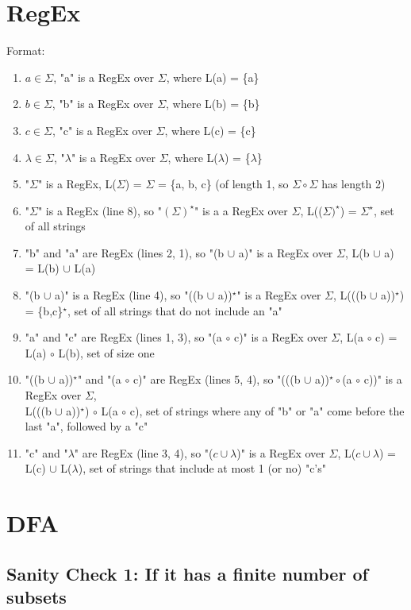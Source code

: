\documentclass{article}
\begin{document}
\section*{RegEx}
Format:
\begin{enumerate}
    \item $a\in\Sigma$, "a" is a RegEx over $\Sigma$, where L(a) = \{a\}
    \item $b\in\Sigma$, "b" is a RegEx over $\Sigma$, where L(b) = \{b\}
    \item $c\in\Sigma$, "c" is a RegEx over $\Sigma$, where L(c) = \{c\}
    \item $\lambda\in\Sigma$, "$\lambda$" is a RegEx over $\Sigma$, where L($\lambda$) = \{$\lambda$\} 
    \item "$\Sigma$" is a RegEx, L($\Sigma$) = $\Sigma$ = \{a, b, c\} (of length 1, so $\Sigma\circ\Sigma$ has length 2)
    \item "$\Sigma$" is a RegEx (line 8), so "$(\Sigma)^\star$" is a  a RegEx over $\Sigma$, L(($\Sigma)^\star$) = $\Sigma^\star$, set of all strings
    \item "b" and "a" are RegEx (lines 2, 1), so "(b $\cup$ a)" is a RegEx over $\Sigma$, L(b $\cup$ a) = L(b) $\cup$ L(a)
    \item "(b $\cup$ a)" is a RegEx (line 4), so "((b $\cup$ a))$^\star$" is a RegEx over $\Sigma$, L(((b $\cup$ a))$^\star$) = \{b,c\}$^\star$, set of all strings
    that do not include an "a"
    \item "a" and "c" are RegEx (lines 1, 3), so "(a $\circ$ c)" is a RegEx over $\Sigma$, L(a $\circ$ c) = L(a) $\circ$ L(b), set of size one
    \item "((b $\cup$ a))$^\star$" and "(a $\circ$ c)" are RegEx (lines 5, 4), so "(((b $\cup$ a))$^\star\circ$(a $\circ$ c))" is a RegEx over $\Sigma$, \\
    L(((b $\cup$ a))$^\star$) $\circ$ L(a $\circ$ c), set of strings where any of "b" or "a" come before the last "a", followed by a "c"
    \item "c" and "$\lambda$" are RegEx (line 3, 4), so "($c\cup\lambda$)" is a RegEx over $\Sigma$, L($c\cup\lambda$) = L(c) $\cup$ L($\lambda$), set of strings that
    include at most 1 (or no) "c's"
\end{enumerate}

\section*{DFA}
\subsection*{Sanity Check 1: If it has a finite number of subsets}
\end{document}

